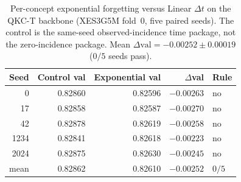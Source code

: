 \begin{table}[H]
\caption{Per-concept exponential forgetting versus Linear
$\Delta t$ on the QKC-T backbone (XES3G5M fold~0, five paired seeds).
The control is the same-seed observed-incidence time package, not the
zero-incidence package.
Mean $\Delta\mathrm{val}{=}{-}0.00252{\pm}0.00019$ ($0/5$ seeds pass).}
\label{tab:p4-raw}
\centering
\footnotesize
\begin{tabular}{@{}rrrrl@{}}
\toprule
Seed & Control val & Exponential val & $\Delta$val & Rule \\
\midrule
0 & 0.82860 & 0.82596 & $-0.00263$ & no \\
17 & 0.82858 & 0.82587 & $-0.00270$ & no \\
42 & 0.82878 & 0.82619 & $-0.00258$ & no \\
1234 & 0.82841 & 0.82618 & $-0.00223$ & no \\
2024 & 0.82875 & 0.82630 & $-0.00245$ & no \\
mean & 0.82862 & 0.82610 & $-0.00252$ & $0/5$ \\
\bottomrule
\end{tabular}
\end{table}
